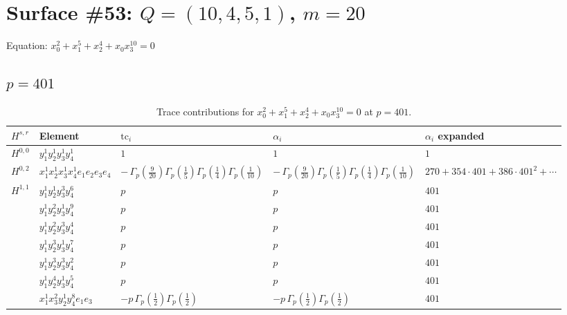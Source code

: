 \documentclass[11pt]{article}
\begin{document}
\newpage

\section*{Surface \#53: $Q=(10, 4, 5, 1)$, $m=20$}

Equation: $x_0^{2} + x_1^{5} + x_2^{4} + x_0 x_3^{10} = 0$

\subsection*{$p = 401$}

\begin{table}[ht]
\centering
\caption{Trace contributions for $x_0^{2} + x_1^{5} + x_2^{4} + x_0 x_3^{10} = 0$ at $p=401$.}\label{tab:deformed-53}
\renewcommand{\arraystretch}{1.1}
{\scriptsize
\begin{tabular}{@{}lllll@{}}
\toprule
$H^{s,r}$ & Element & $\mathrm{tc}_i$ & $\alpha_i$ & $\alpha_i$ expanded \\
\midrule
$H^{0,0}$ & $y_{1}^{1} y_{2}^{1} y_{3}^{1} y_{4}^{1}$ & $1$ & $1$ & $1$ \\
\midrule
$H^{0,2}$ & $x_{1}^{1} x_{2}^{1} x_{3}^{1} x_{4}^{1}  e_{1} e_{2} e_{3} e_{4}$ & $- \, \Gamma_p \left( \frac{9}{20} \right) \Gamma_p \left( \frac{1}{5} \right) \Gamma_p \left( \frac{1}{4} \right) \Gamma_p \left( \frac{1}{10} \right)$ & $- \, \Gamma_p \left( \frac{9}{20} \right) \Gamma_p \left( \frac{1}{5} \right) \Gamma_p \left( \frac{1}{4} \right) \Gamma_p \left( \frac{1}{10} \right)$ & $270{+}354{\cdot}401{+}386{\cdot}401^{2}{+}\cdots$ \\
\midrule
$H^{1,1}$ & $y_{1}^{1} y_{2}^{1} y_{3}^{3} y_{4}^{6}$ & $p \,$ & $p \,$ & $401$ \\
 & $y_{1}^{1} y_{2}^{2} y_{3}^{1} y_{4}^{9}$ & $p \,$ & $p \,$ & $401$ \\
 & $y_{1}^{1} y_{2}^{2} y_{3}^{3} y_{4}^{4}$ & $p \,$ & $p \,$ & $401$ \\
 & $y_{1}^{1} y_{2}^{3} y_{3}^{1} y_{4}^{7}$ & $p \,$ & $p \,$ & $401$ \\
 & $y_{1}^{1} y_{2}^{3} y_{3}^{3} y_{4}^{2}$ & $p \,$ & $p \,$ & $401$ \\
 & $y_{1}^{1} y_{2}^{4} y_{3}^{1} y_{4}^{5}$ & $p \,$ & $p \,$ & $401$ \\
 & $x_{1}^{1} x_{3}^{2} y_{2}^{1} y_{4}^{8} e_{1} e_{3}$ & $- p \, \Gamma_p \left( \frac{1}{2} \right) \Gamma_p \left( \frac{1}{2} \right)$ & $- p \, \Gamma_p \left( \frac{1}{2} \right) \Gamma_p \left( \frac{1}{2} \right)$ & $401$ \\

\end{tabular}}
\end{table}
\end{document}
